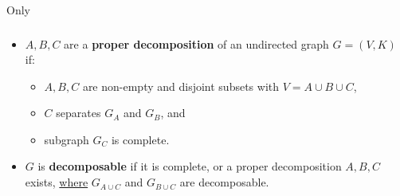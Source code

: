 \begin{frame}{Only} \frametitle{\subsubsecname}
	\vspace{-2mm}
	\begingroup
	\slidesonly{\footnotesize}
	\begin{itemize}
		\item $A,B,C$ are a \textbf{proper decomposition} 
			of an undirected graph $G = (V,K)$ if:
			\begin{itemize}
				\item $A,B,C$ are non-empty and 
					disjoint subsets with $V=A \cup B \cup C$,
				\item $C$ separates $G_A$ and $G_B$, and
				\item subgraph $G_C$ is complete.
			\end{itemize}
		\item $G$ is \textbf{decomposable} if it is complete, 
			or a proper decomposition $A,B,C$ exists,
			\underline{where} $G_{A\cup C}$ and $G_{B \cup C}$ are decomposable.
	\end{itemize}
	\endgroup
	
	\slidesonly{\vspace{-4mm}}
	
	\pause
	

	\slidesonly{\vspace{-9mm}}
	

\end{frame}
